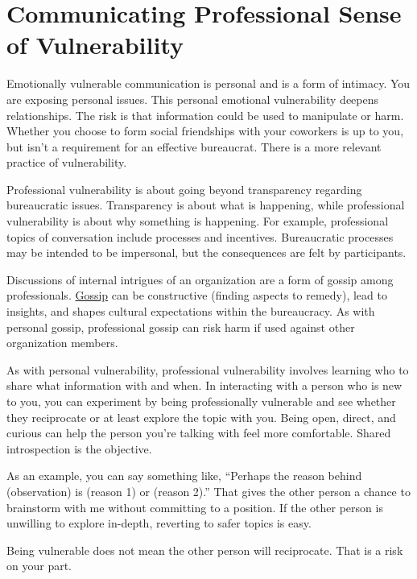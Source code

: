 \section{Communicating Professional Sense of Vulnerability\label{sec:professional-vulnerability}}

Emotionally vulnerable communication is personal and is a form of intimacy. You are exposing personal issues. This personal emotional vulnerability deepens relationships. The risk is that information could be used to manipulate or harm. Whether you choose to form social friendships with your coworkers is up to you, but isn't a requirement for an effective bureaucrat. There is a more relevant practice of vulnerability.

Professional vulnerability is about going beyond transparency regarding bureaucratic issues. Transparency is about what is happening, while professional vulnerability is about why something is happening. For example, professional topics of conversation include processes and incentives. Bureaucratic processes may be intended to be impersonal, but the consequences are felt by participants.


Discussions of internal intrigues of an organization are a form of gossip among professionals. \href{https://en.wikipedia.org/wiki/Gossip}{Gossip} 
\iftoggle{WPinmargin}{\marginpar{[Wikipedia] Gossip}}{}
can be constructive (finding aspects to remedy),  lead to insights, and shapes cultural expectations within the bureaucracy. As with personal gossip, professional gossip can risk harm if used against other organization members. 

As with personal vulnerability, professional vulnerability involves learning who to share what information with and when. In interacting with a person who is new to you, you can experiment by being professionally vulnerable and see whether they reciprocate or at least explore the topic with you. Being open, direct, and curious can help the person you're talking with feel more comfortable. Shared introspection is the objective. 

As an example, you can say something like, ``Perhaps the reason behind (observation) is (reason 1) or (reason 2).'' That gives the other person a chance to brainstorm with me without committing to a position. If the other person is unwilling to explore in-depth, reverting to safer topics is easy.

Being vulnerable does not mean the other person will reciprocate. That is a risk on your part. 